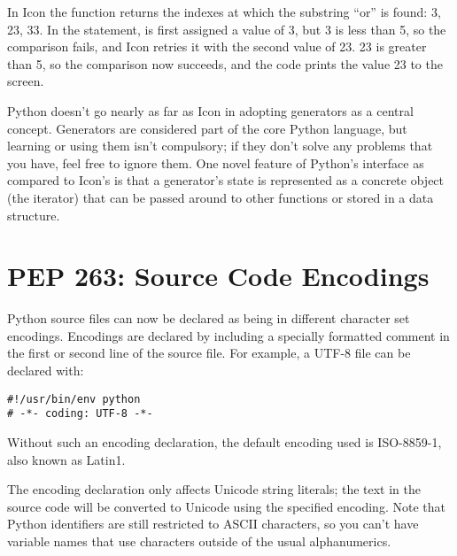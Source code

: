 \documentclass{howto}
\begin{document}
In Icon the  function returns the indexes at which the
substring ``or'' is found: 3, 23, 33.  In the  statement,
 is first assigned a value of 3, but 3 is less than 5, so the
comparison fails, and Icon retries it with the second value of 23.  23
is greater than 5, so the comparison now succeeds, and the code prints
the value 23 to the screen.

Python doesn't go nearly as far as Icon in adopting generators as a
central concept.  Generators are considered part of the core
Python language, but learning or using them isn't compulsory; if they
don't solve any problems that you have, feel free to ignore them.
One novel feature of Python's interface as compared to
Icon's is that a generator's state is represented as a concrete object
(the iterator) that can be passed around to other functions or stored
in a data structure.

\begin{seealso}


\end{seealso}


\section{PEP 263: Source Code Encodings \label{section-encodings}}

Python source files can now be declared as being in different
character set encodings.  Encodings are declared by including a
specially formatted comment in the first or second line of the source
file.  For example, a UTF-8 file can be declared with:

\begin{verbatim}
#!/usr/bin/env python
# -*- coding: UTF-8 -*-
\end{verbatim}

Without such an encoding declaration, the default encoding used is
ISO-8859-1, also known as Latin1.

The encoding declaration only affects Unicode string literals; the
text in the source code will be converted to Unicode using the
specified encoding.  Note that Python identifiers are still restricted
to ASCII characters, so you can't have variable names that use
characters outside of the usual alphanumerics.
\end{document}

